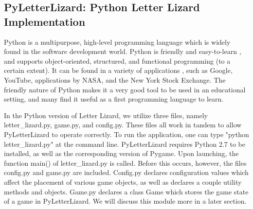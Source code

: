\documentclass[11pt]{article}
\begin{document}
\subsection{PyLetterLizard: Python Letter Lizard Implementation}







Python is a multipurpose, high-level programming language which is widely found in the software development world. Python is friendly and easy-to-learn \cite{about_python}, and supports object-oriented, structured, and functional programming (to a certain extent). It can be found in a variety of applications \cite{whatis_python}, such as Google, YouTube, applications by NASA, and the New York Stock Exchange. The friendly nature of Python makes it a very good tool to be used in an educational setting, and many find it useful as a first programming language to learn.
	
	
	In the Python version of Letter Lizard, we utilize three files, namely letter\_lizard.py, game.py, and config.py. These files all work in tandem to allow PyLetterLizard to operate correctly. To run the application, one can type "python letter\_lizard.py" at the command line. PyLetterLizard requires Python 2.7 to be installed, as well as the corresponding version of Pygame.  Upon launching, the function main() of letter\_lizard.py is called. Before this occurs, however, the files config.py and game.py are included. Config.py declares configuration values which affect the placement of various game objects, as well as declares a couple utility methods and objects. Game.py declares a class Game which stores the game state of a game in PyLetterLizard. We will discuss this module more in a later section.
	
\end{document}
